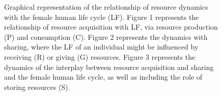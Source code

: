 \documentclass{article}
\begin{document}
\begin{figure}[H]
    \caption{Graphical representation of the relationship of resource dynamics with the female human life cycle (LF). Figure 1 represents the relationship of resource acquisition with LF, via resource production (P) and consumption (C). Figure 2 represents the dynamics with sharing, where the LF of an individual might be influenced by receiving (R) or giving (G) resources. Figure 3 represents the dynamics of the interplay between resource acquisition and sharing and the female human life cycle, as well as including the role of storing resources (S).}
    \label{fig:1}
\end{figure}
\end{document}
